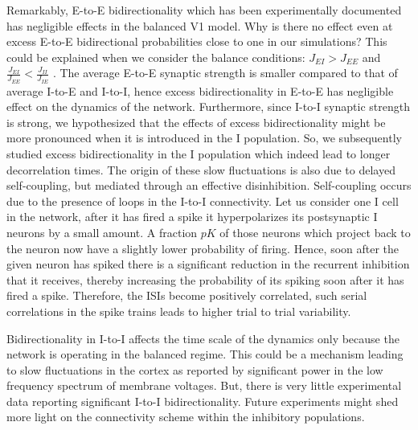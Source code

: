 Remarkably, E-to-E bidirectionality which has been experimentally documented has negligible effects in the balanced V1 model. Why is there no effect even at excess E-to-E bidirectional probabilities close to one in our simulations?  This could be explained when we consider the balance conditions: $J_{EI} > J_{EE}$ and $\frac{J_{EI}}{J_{EE}} < \frac{J_{II}}{J_{IE}}$ \cite{carl1998}. The average E-to-E synaptic strength is smaller compared to that of average I-to-E and I-to-I, hence excess bidirectionality in E-to-E has negligible effect on the dynamics of the network. Furthermore, since I-to-I synaptic strength is strong, we hypothesized that the effects of excess bidirectionality might be more pronounced when it is introduced in the I population. So, we subsequently studied excess bidirectionality in the I population which indeed lead to longer decorrelation times.
The origin of these slow fluctuations is also due to delayed self-coupling, but mediated through an effective disinhibition. Self-coupling occurs due to the presence of loops in the I-to-I connectivity. Let us consider one I cell in the network, after it has fired a spike it hyperpolarizes its postsynaptic I neurons by a small amount. A fraction $pK$ of those neurons which project back to the neuron now have a slightly lower probability of firing. Hence, soon after the given neuron has spiked there is a significant reduction in the recurrent inhibition that it receives, thereby increasing the probability of its spiking soon after it has fired a spike. Therefore, the ISIs become positively correlated, such serial correlations in the spike trains leads to higher trial to trial variability. 

Bidirectionality in I-to-I affects the time scale of the dynamics only because the network is operating in the balanced regime. This could be a mechanism leading to slow fluctuations in the cortex as reported by significant power in the low frequency spectrum of membrane voltages\cite{Tan2014}. But, there is very little experimental data reporting significant I-to-I bidirectionality. Future experiments might shed more light on the connectivity scheme within the inhibitory populations.

